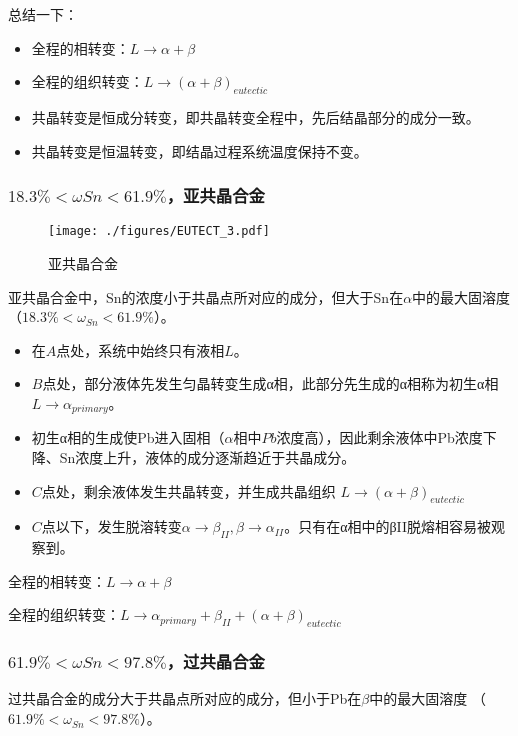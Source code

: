 总结一下：
\begin{itemize}
\item 全程的相转变：$L \rightarrow \alpha+\beta$
\item 全程的组织转变：$L \rightarrow (\alpha+\beta)_{eutectic}$
\item 共晶转变是恒成分转变，即共晶转变全程中，先后结晶部分的成分一致。
\item 共晶转变是恒温转变，即结晶过程系统温度保持不变。
\end{itemize}

\subsubsection{$18.3\%<\omega Sn<61.9\%$，亚共晶合金}
\begin{figure}[ht]
\centering
\texttt{[image: ./figures/EUTECT\_3.pdf]}
\caption{亚共晶合金} \label{EUTECT_fig3}
\end{figure}

亚共晶合金中，Sn的浓度小于共晶点所对应的成分，但大于Sn在$\alpha$中的最大固溶度 （$18.3\%<\omega_{Sn}<61.9\%$）。

\begin{itemize}
\item 在$A$点处，系统中始终只有液相$L$。
\item $B$点处，部分液体先发生匀晶转变生成α相，此部分先生成的α相称为初生α相$L \rightarrow \alpha_{primary}$。
\item 初生α相的生成使Pb进入固相（$\alpha$相中$Pb$浓度高），因此剩余液体中Pb浓度下降、Sn浓度上升，液体的成分逐渐趋近于共晶成分。
\item $C$点处，剩余液体发生共晶转变，并生成共晶组织 $L \rightarrow (\alpha+\beta)_{eutectic}$
\item $C$点以下，发生脱溶转变$\alpha \rightarrow \beta_{II}, \beta \rightarrow \alpha_{II}$。只有在α相中的βII脱熔相容易被观察到。
\end{itemize}

全程的相转变：$L \rightarrow \alpha+\beta$

全程的组织转变：$L \rightarrow \alpha_{primary}+\beta_{II}+(\alpha+\beta)_{eutectic}$

\subsubsection{$61.9\%<\omega Sn<97.8\%$，过共晶合金}
过共晶合金的成分大于共晶点所对应的成分，但小于Pb在$\beta$中的最大固溶度 （$61.9\%<\omega_{Sn}<97.8\%$）。

